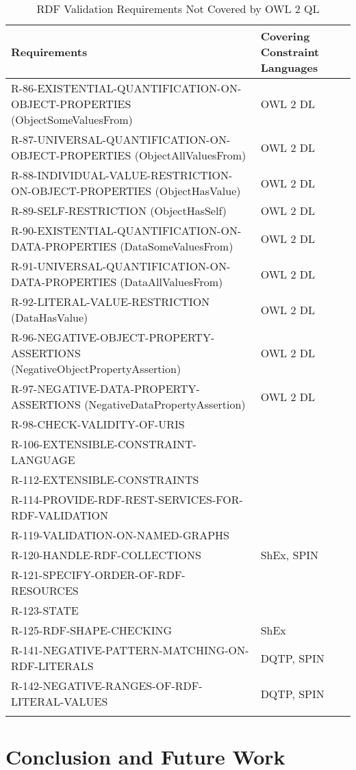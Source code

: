 \documentclass{llncs}
\newcommand{\hr}{\hline\noalign{\smallskip}} %
\begin{document}
\begin{table}
\caption{RDF Validation Requirements Not Covered by OWL 2 QL}
\label{tab:RequirementsNotCoveredOWL2QL-3}
\centering
\begin{tabular}{ll}
\hr
Requirements & Covering Constraint Languages \\
\hr
R-86-EXISTENTIAL-QUANTIFICATION-ON-OBJECT-PROPERTIES (ObjectSomeValuesFrom) & OWL 2 DL \\
R-87-UNIVERSAL-QUANTIFICATION-ON-OBJECT-PROPERTIES (ObjectAllValuesFrom) & OWL 2 DL \\
R-88-INDIVIDUAL-VALUE-RESTRICTION-ON-OBJECT-PROPERTIES (ObjectHasValue) & OWL 2 DL \\
R-89-SELF-RESTRICTION (ObjectHasSelf) & OWL 2 DL \\
R-90-EXISTENTIAL-QUANTIFICATION-ON-DATA-PROPERTIES (DataSomeValuesFrom) & OWL 2 DL \\
R-91-UNIVERSAL-QUANTIFICATION-ON-DATA-PROPERTIES (DataAllValuesFrom) & OWL 2 DL \\
R-92-LITERAL-VALUE-RESTRICTION (DataHasValue) & OWL 2 DL \\
R-96-NEGATIVE-OBJECT-PROPERTY-ASSERTIONS (NegativeObjectPropertyAssertion) & OWL 2 DL \\
R-97-NEGATIVE-DATA-PROPERTY-ASSERTIONS (NegativeDataPropertyAssertion) & OWL 2 DL \\
R-98-CHECK-VALIDITY-OF-URIS & \\
R-106-EXTENSIBLE-CONSTRAINT-LANGUAGE & \\
R-112-EXTENSIBLE-CONSTRAINTS & \\
R-114-PROVIDE-RDF-REST-SERVICES-FOR-RDF-VALIDATION & \\
R-119-VALIDATION-ON-NAMED-GRAPHS & \\
R-120-HANDLE-RDF-COLLECTIONS & ShEx, SPIN \\
R-121-SPECIFY-ORDER-OF-RDF-RESOURCES & \\
R-123-STATE & \\
R-125-RDF-SHAPE-CHECKING & ShEx \\

R-141-NEGATIVE-PATTERN-MATCHING-ON-RDF-LITERALS & DQTP, SPIN \\
R-142-NEGATIVE-RANGES-OF-RDF-LITERAL-VALUES & DQTP, SPIN \\
\hr
\end{tabular}
\end{table}

\section{Conclusion and Future Work}
\end{document}
